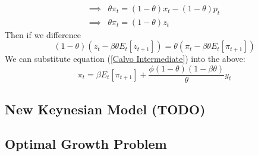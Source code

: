 \documentclass[12pt]{article}
\begin{document}
\begin{itemize}
\[\begin{split}
        \implies &\theta \pi_t = (1-\theta)x_t - (1-\theta)p_t \\
        \implies &\theta \pi_t = (1-\theta)z_t
    \end{split}\]
    Then if we difference
    \[(1-\theta)(z_t -\beta\theta E_t[z_{t+1}])= \theta(\pi_t - \beta\theta E_t[\pi_{t+1}])\]
    We can substitute equation (\ref{Calvo Intermediate}) into the above:
    \begin{equation}\label{Calvo Phillips Curve}
    \pi_t = \beta E_t[\pi_{t+1}] + \frac{\phi(1-\theta)(1-\beta\theta)}{\theta} y_t
    \end{equation}
\end{itemize}

\subsection{New Keynesian Model (TODO)}

\subsection{Optimal Growth Problem}
\end{document}
